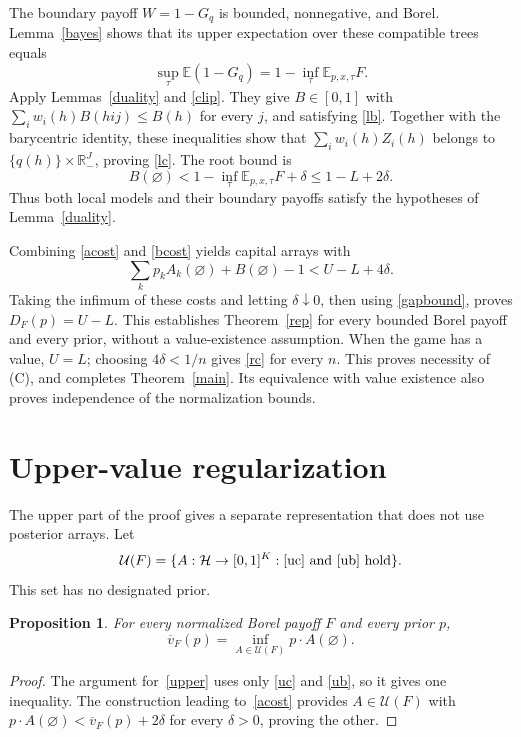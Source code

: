 \documentclass[11pt,a4paper]{article}
\newtheorem{proposition}[theorem]{Proposition}
\theoremstyle{definition}
\theoremstyle{remark}
\newcommand{\R}{\mathbb R}
\newcommand{\E}{\mathbb E}
\newcommand{\HH}{\mathcal H}
\newcommand{\uv}{\overline v}
\newcommand{\UU}{\mathcal U}
\begin{document}
The boundary payoff $W=1-G_q$ is bounded, nonnegative, and Borel.
Lemma~\ref{bayes} shows that its upper expectation over these compatible
trees equals
\[
 \sup_\tau\E(1-G_q)=1-\inf_\tau\E_{p,x,\tau}F.
\]
Apply Lemmas~\ref{duality} and \ref{clip}. They give $B\in[0,1]$ with
$\sum_i w_i(h)B(hij)\leq B(h)$ for every $j$, and satisfying
\eqref{lb}. Together with the barycentric identity, these inequalities
show that $\sum_i w_i(h)Z_i(h)$ belongs to
$\{q(h)\}\times\R_-^J$, proving \eqref{lc}. The root bound is
\begin{equation}
 B(\varnothing)<1-\inf_\tau\E_{p,x,\tau}F+\delta
 \leq1-L+2\delta.
 \label{bcost}
\end{equation}
Thus both local models and their boundary payoffs satisfy the
hypotheses of Lemma~\ref{duality}.

Combining \eqref{acost} and \eqref{bcost} yields capital arrays with
\[
 \sum_k p_k A_k(\varnothing)+B(\varnothing)-1
 <U-L+4\delta.
\]
Taking the infimum of these costs and letting $\delta\downarrow0$, then
using \eqref{gapbound}, proves
$D_F(p)=U-L$. This establishes Theorem~\ref{rep} for every bounded
Borel payoff and every prior, without a value-existence assumption.
When the game has a value, $U=L$; choosing $4\delta<1/n$ gives
\eqref{rc} for every $n$. This proves necessity of (C), and completes
Theorem~\ref{main}. Its equivalence with value existence also proves
independence of the normalization bounds.


\section{Upper-value regularization}\label{sec:regularization}

The upper part of the proof gives a separate representation that does
not use posterior arrays. Let
\[
 \UU(F)=\{A:\HH\to[0,1]^K:\text{\eqref{uc} and \eqref{ub} hold}\}.
\]
This set has no designated prior.

\begin{proposition}\label{prop:upperdual}
For every normalized Borel payoff $F$ and every prior $p$,
\begin{equation}\label{eq:upperdual}
 \uv_F(p)=\inf_{A\in\UU(F)}p\cdot A(\varnothing).
\end{equation}
\end{proposition}
\begin{proof}
The argument for~\eqref{upper} uses only \eqref{uc} and \eqref{ub},
so it gives one inequality. The construction leading to~\eqref{acost}
provides $A\in\UU(F)$ with $p\cdot A(\varnothing)<\uv_F(p)+2\delta$
for every $\delta>0$, proving the other.
\end{proof}
\end{document}
